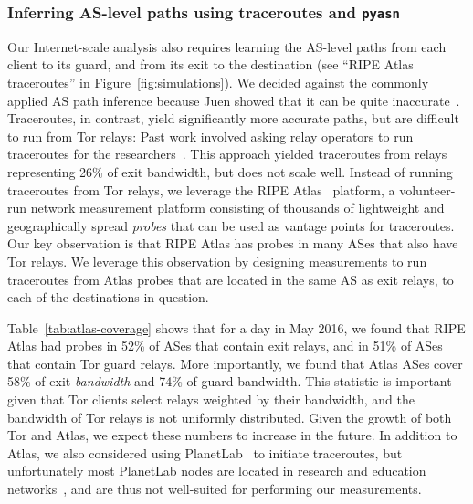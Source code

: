\subsubsection{Inferring AS-level paths using traceroutes and {\tt pyasn}}

Our Internet-scale analysis also requires learning the AS-level paths from each
client to its guard, and from its exit to the destination (see ``RIPE Atlas
traceroutes'' in Figure~\ref{fig:simulations}).  We decided against the commonly
applied AS path inference because Juen \ea showed that it can be quite
inaccurate~\cite{Juen2015a}.  Traceroutes, in contrast, yield significantly more
accurate paths, but are difficult to run from Tor relays:  Past work involved
asking relay operators to run traceroutes for the
researchers~\cite[\S~4]{Juen2015a}.  This approach yielded traceroutes from
relays representing 26\% of exit bandwidth, but does not scale well.  Instead of
running traceroutes from Tor relays, we leverage the RIPE Atlas~\cite{atlas}
platform, a volunteer-run network measurement platform consisting of thousands
of lightweight and geographically spread \emph{probes} that can be used as
vantage points for traceroutes.  Our key observation is that RIPE Atlas has
probes in many ASes that also have Tor relays.  We leverage this observation by
designing measurements to run traceroutes from Atlas probes that are located in
the same AS as exit relays, to each of the destinations in question.

Table~\ref{tab:atlas-coverage} shows that for a day in May 2016, we found that
RIPE Atlas had probes in 52\% of ASes that contain exit relays, and in 51\% of
ASes that contain Tor guard relays.  More importantly, we found that Atlas ASes
cover 58\% of exit \emph{bandwidth} and 74\% of guard bandwidth.  This statistic
is important given that Tor clients select relays weighted by their bandwidth,
and the bandwidth of Tor relays is not uniformly distributed.  Given the growth
of both Tor and Atlas, we expect these numbers to increase in the future.  In
addition to Atlas, we also considered using PlanetLab~\cite{planetlab} to
initiate traceroutes, but unfortunately most PlanetLab nodes are located in
research and education networks~\cite{Banerjee2004a}, and are thus not
well-suited for performing our measurements.

